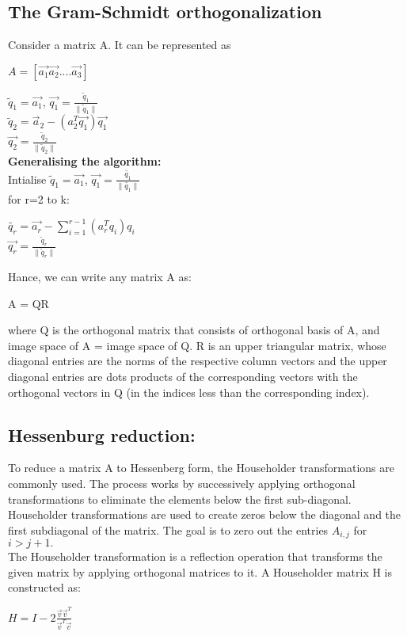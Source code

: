 \documentclass{article}
\begin{document}
\subsection{The Gram-Schmidt orthogonalization}
Consider a matrix A. It can be represented as 
\begin{center}
    $A=\left[\vec{a_1} \vec{a_2}....\vec{a_3}\right]$
\end{center}
$\tilde{q}_1 = \vec{a_1}$, $\vec{q_1}=\frac{\tilde{q}_1}{\|\tilde{q}_1\|}$\\
$\tilde{q}_2 = \vec{a}_2 - (a_2^T\vec{q_1})\vec{q_1}$\\
$\vec{q_2}=\frac{\tilde{q}_2}{\|\tilde{q}_2\|}$\\
\textbf{Generalising the algorithm:}\\
Intialise $\tilde{q}_1=\vec{a_1}$, $\vec{q_1}=\frac{\tilde{q_1}}{\|\tilde{q_1}\|}$\\
for r=2 to k:\\
\begin{center}
$\tilde{q_r} = \vec{a_r} - $\(\sum_{i=1}^{r-1} (a_r^Tq_i)q_i\)\\
$\vec{q_r}=\frac{\tilde{q}_r}{\|\tilde{q}_r\|}$
\end{center}
Hance, we can write any matrix A as: 
\begin{center}
A = QR\\

\end{center}
where Q is the orthogonal matrix that consists of orthogonal basis of A, and image space of A = image space of Q.
R is an upper triangular matrix, whose diagonal entries are the norms of the respective column vectors and the upper diagonal entries are dots products of the corresponding vectors with the orthogonal vectors in Q (in the indices less than the corresponding index).
\subsection{Hessenburg reduction:}
To reduce a matrix A to Hessenberg form, the Householder transformations are commonly used. The process works by successively applying orthogonal transformations to eliminate the elements below the first sub-diagonal.\\
Householder transformations are used to create zeros below the diagonal and the first subdiagonal of the matrix. The goal is to zero out the entries $A_{i,j}$ for $i>j+1.$\\
The Householder transformation is a reflection operation that transforms the given matrix by applying orthogonal matrices to it. A Householder matrix H is constructed as:
\begin{center}
  $H=I-2\frac{\vec{v}\vec{v}^T}{\vec{v}^T\vec{v}}$
\end{center}
\end{document}

